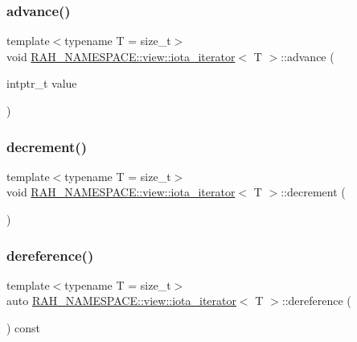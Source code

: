 \subsubsection{\texorpdfstring{advance()}{advance()}}
{\footnotesize\ttfamily template$<$typename T  = size\+\_\+t$>$ \\
void \mbox{\hyperlink{struct_r_a_h___n_a_m_e_s_p_a_c_e_1_1view_1_1iota__iterator}{R\+A\+H\+\_\+\+N\+A\+M\+E\+S\+P\+A\+C\+E\+::view\+::iota\+\_\+iterator}}$<$ T $>$\+::advance (\begin{DoxyParamCaption}\item[{intptr\+\_\+t}]{value }\end{DoxyParamCaption})\hspace{0.3cm}{\ttfamily [inline]}}

\mbox{\label{struct_r_a_h___n_a_m_e_s_p_a_c_e_1_1view_1_1iota__iterator_a3d1057926668d81a132743b7759b85f3}} 
\subsubsection{\texorpdfstring{decrement()}{decrement()}}
{\footnotesize\ttfamily template$<$typename T  = size\+\_\+t$>$ \\
void \mbox{\hyperlink{struct_r_a_h___n_a_m_e_s_p_a_c_e_1_1view_1_1iota__iterator}{R\+A\+H\+\_\+\+N\+A\+M\+E\+S\+P\+A\+C\+E\+::view\+::iota\+\_\+iterator}}$<$ T $>$\+::decrement (\begin{DoxyParamCaption}{ }\end{DoxyParamCaption})\hspace{0.3cm}{\ttfamily [inline]}}

\mbox{\label{struct_r_a_h___n_a_m_e_s_p_a_c_e_1_1view_1_1iota__iterator_add7ead594ba726657ae900c4a3c7948c}} 
\subsubsection{\texorpdfstring{dereference()}{dereference()}}
{\footnotesize\ttfamily template$<$typename T  = size\+\_\+t$>$ \\
auto \mbox{\hyperlink{struct_r_a_h___n_a_m_e_s_p_a_c_e_1_1view_1_1iota__iterator}{R\+A\+H\+\_\+\+N\+A\+M\+E\+S\+P\+A\+C\+E\+::view\+::iota\+\_\+iterator}}$<$ T $>$\+::dereference (\begin{DoxyParamCaption}{ }\end{DoxyParamCaption}) const\hspace{0.3cm}{\ttfamily [inline]}}

